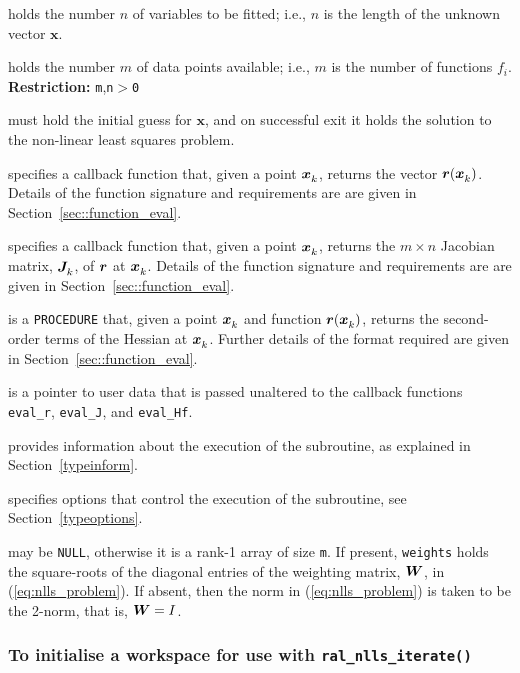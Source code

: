 \documentclass{spec}
\begin{document}
\begin{description}
 holds the number $n$ of
variables to be fitted; i.e., $n$ is the length of the unknown vector $\bm x$.

 holds the number $m$ of
data points available; i.e., $m$ is the number of functions $f_i$.
\textbf{Restriction:} \texttt{m},\texttt{n}$>$\texttt{0}

 must hold the initial guess for $\bm x$, and on
successful exit it holds the solution to the non-linear least squares problem.

 specifies a callback function that, given a point ${\bm x}_{k}^{}$,
returns the vector ${\bm r}({\bm x}_{k}^{})$. Details of the function signature and
requirements are are given in Section~\ref{sec::function_eval}.

 specifies a callback function that, given a point ${\bm x}_{k}^{}$,
returns the $m \times n$ Jacobian matrix, ${\bm J}_{k}^{}$, of ${\bm r}$ at ${\bm x}_{k}^{}$. Details of the function signature and requirements are are given in
Section~\ref{sec::function_eval}.

 is a {\tt PROCEDURE} that, given a point ${\bm x}_{k}^{}$
and function ${\bm r}({\bm x}_{k}^{})$, returns the second-order terms of the Hessian at ${\bm x}_{k}^{}$.
Further details of the format required are given in Section~\ref{sec::function_eval}.

 is a pointer to user data that is passed unaltered to the callback
functions {\tt eval\_r}, {\tt eval\_J}, and {\tt eval\_Hf}.

 provides information about the execution
of the subroutine, as explained in Section~\ref{typeinform}.

 specifies options that control the execution of the subroutine,
see Section~\ref{typeoptions}.

 may be {\tt NULL}, otherwise it is a rank-1 array of size {\tt m}. If present, {\tt weights} holds the square-roots of the
diagonal entries of the weighting matrix, ${\bm W}$, in (\ref{eq:nlls_problem}).  If absent, then the norm in (\ref{eq:nlls_problem}) is taken to be the 2-norm, that is, ${\bm W} = I$.
\end{description}

\subsubsection{To initialise a workspace for use with \texttt{ral\_nlls\_iterate()}}
\end{document}
